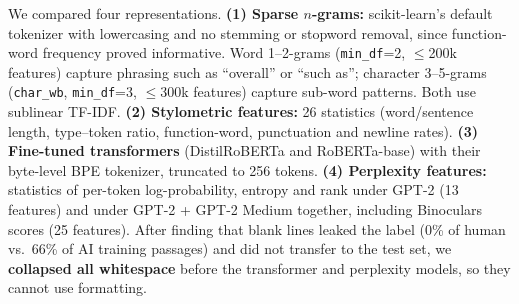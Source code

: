 
We compared four representations. \textbf{(1) Sparse $n$-grams:} scikit-learn's
default tokenizer with lowercasing and no stemming or stopword removal, since
function-word frequency proved informative. Word 1--2-grams
(\texttt{min\_df}=2, $\le$200k features) capture phrasing such as ``overall'' or
``such as''; character 3--5-grams (\texttt{char\_wb}, \texttt{min\_df}=3,
$\le$300k features) capture sub-word patterns. Both use sublinear TF-IDF.
\textbf{(2) Stylometric features:} 26 statistics (word/sentence length,
type--token ratio, function-word, punctuation and newline rates).
\textbf{(3) Fine-tuned transformers} (DistilRoBERTa and RoBERTa-base) with their
byte-level BPE tokenizer, truncated to 256 tokens. \textbf{(4) Perplexity
features:} statistics of per-token log-probability, entropy and rank under GPT-2
(13 features) and under GPT-2 + GPT-2 Medium together, including Binoculars
scores (25 features). After finding that blank lines leaked the label (0\% of
human vs.\ 66\% of AI training passages) and did not transfer to the test set,
we \textbf{collapsed all whitespace} before the transformer and perplexity
models, so they cannot use formatting.

